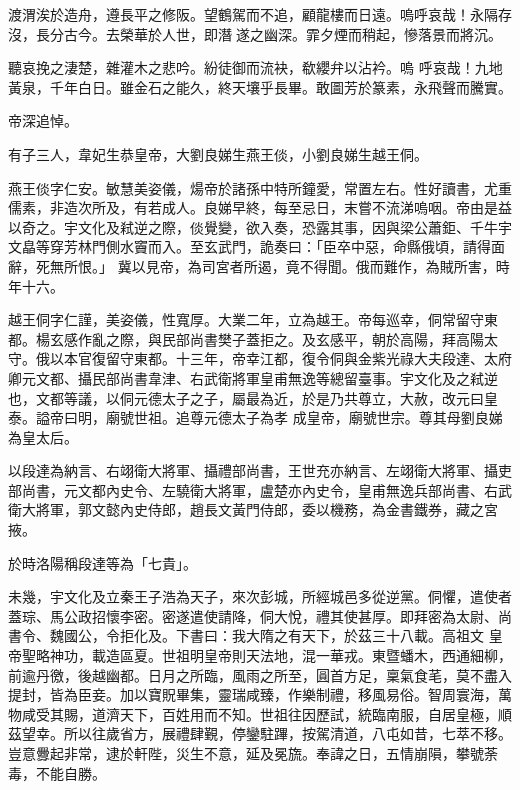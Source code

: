 \begin{pinyinscope}
 渡渭涘於造舟，遵長平之修阪。望鶴駕而不追，顧龍樓而日遠。嗚呼哀哉！永隔存沒，長分古今。去榮華於人世，即潛遂之幽深。霏夕煙而稍起，慘落景而將沉。



 聽哀挽之淒楚，雜灌木之悲吟。紛徒御而流袂，欷纓弁以沾衿。嗚
 呼哀哉！九地黃泉，千年白日。雖金石之能久，終天壤乎長畢。敢圖芳於篆素，永飛聲而騰實。



 帝深追悼。



 有子三人，韋妃生恭皇帝，大劉良娣生燕王倓，小劉良娣生越王侗。



 燕王倓字仁安。敏慧美姿儀，煬帝於諸孫中特所鐘愛，常置左右。性好讀書，尤重儒素，非造次所及，有若成人。良娣早終，每至忌日，末嘗不流涕嗚咽。帝由是益以奇之。宇文化及弒逆之際，倓覺變，欲入奏，恐露其事，因與梁公蕭鉅、千牛宇文皛等穿芳林門側水竇而入。至玄武門，詭奏曰：「臣卒中惡，命縣俄頃，請得面辭，死無所恨。」
 冀以見帝，為司宮者所遏，竟不得聞。俄而難作，為賊所害，時年十六。



 越王侗字仁謹，美姿儀，性寬厚。大業二年，立為越王。帝每巡幸，侗常留守東都。楊玄感作亂之際，與民部尚書樊子蓋拒之。及玄感平，朝於高陽，拜高陽太守。俄以本官復留守東都。十三年，帝幸江都，復令侗與金紫光祿大夫段達、太府卿元文都、攝民部尚書韋津、右武衛將軍皇甫無逸等總留臺事。宇文化及之弒逆也，文都等議，以侗元德太子之子，屬最為近，於是乃共尊立，大赦，改元曰皇泰。謚帝曰明，廟號世祖。追尊元德太子為孝
 成皇帝，廟號世宗。尊其母劉良娣為皇太后。



 以段達為納言、右翊衛大將軍、攝禮部尚書，王世充亦納言、左翊衛大將軍、攝吏部尚書，元文都內史令、左驍衛大將軍，盧楚亦內史令，皇甫無逸兵部尚書、右武衛大將軍，郭文懿內史侍郎，趙長文黃門侍郎，委以機務，為金書鐵券，藏之宮掖。



 於時洛陽稱段達等為「七貴」。



 未幾，宇文化及立秦王子浩為天子，來次彭城，所經城邑多從逆黨。侗懼，遣使者蓋琮、馬公政招懷李密。密遂遣使請降，侗大悅，禮其使甚厚。即拜密為太尉、尚書令、魏國公，令拒化及。下書曰：我大隋之有天下，於茲三十八載。高祖文
 皇帝聖略神功，載造區夏。世祖明皇帝則天法地，混一華戎。東暨蟠木，西通細柳，前逾丹徼，後越幽都。日月之所臨，風雨之所至，圓首方足，稟氣食芼，莫不盡入提封，皆為臣妾。加以寶貺畢集，靈瑞咸臻，作樂制禮，移風易俗。智周寰海，萬物咸受其賜，道濟天下，百姓用而不知。世祖往因歷試，統臨南服，自居皇極，順茲望幸。所以往歲省方，展禮肆覲，停鑾駐蹕，按駕清道，八屯如昔，七萃不移。豈意釁起非常，逮於軒陛，災生不意，延及冕旒。奉諱之日，五情崩隕，攀號荼毒，不能自勝。




\end{pinyinscope}
